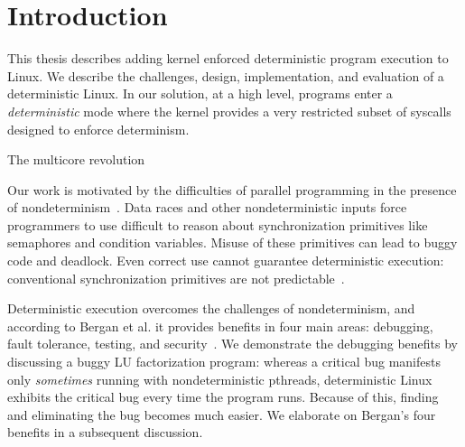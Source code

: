 
\section{Introduction}
\label{s:intro}

This thesis describes adding kernel enforced deterministic program execution to
Linux. We describe the challenges, design, implementation, and evaluation of
a deterministic Linux.
In our solution, at a high level, programs enter a \emph{deterministic}
mode where the kernel provides a very restricted subset of syscalls designed to
enforce determinism.
\iffalse
The kernel enforces determinism, thus making it impossible
for user programs to possibly behave nondeterministically, even by deliberate
design. Internal nondeterministic inputs like hardware data races are entirely
eliminated, and explicitly nondeterministic inputs like user input or time of
day become controllable explicit I/O.
\fi

\iffalse
A program is deterministic if for a fixed input, the program always returns the
same output. This is desirable, because it simplifies testing and debugging of
ever more ubiquitous parallel programs. Linux's parallel programming model is
inherently nondeterministic, but having the option to run deterministically
would be a great feature as computing moves towards using multiple cores.
\fi

The multicore revolution 

Our work is motivated by the difficulties of parallel programming in the
presence of nondeterminism~\cite{lee2006problem}.
Data races and other nondeterministic inputs force programmers to use
difficult to reason about synchronization primitives like semaphores and
condition variables. Misuse of these primitives can lead to buggy code and
deadlock. Even correct use cannot guarantee deterministic execution:
conventional synchronization primitives are not predictable~\cite{Aviram10}.

Deterministic execution overcomes the challenges of nondeterminism, and
according to Bergan et al. it provides benefits in four main areas: debugging,
fault tolerance, testing, and security~\cite{Bergan11}. We demonstrate the
debugging benefits by discussing a buggy LU factorization program: whereas a
critical bug manifests only \emph{sometimes} running with nondeterministic
pthreads, deterministic Linux exhibits the critical bug every time the program
runs. Because of this, finding and eliminating the bug becomes much easier. We
elaborate on Bergan's four benefits in a subsequent discussion.

